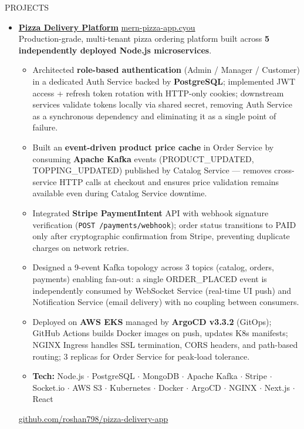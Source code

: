 \documentclass{resume}
\begin{document}
\begin{rSection}{PROJECTS}
\begin{itemize}

\item \href{https://github.com/roshan798/pizza-delivery-app}{\textbf{Pizza Delivery Platform}}
  \hfill \href{https://mern-pizza-app.cyou}{mern-pizza-app.cyou}\\
  Production-grade, multi-tenant pizza ordering platform built across
  \textbf{5 independently deployed Node.js microservices}.
  \begin{itemize}
    \itemsep -3pt
    \item Architected \textbf{role-based authentication} (Admin / Manager / Customer)
          in a dedicated Auth Service backed by \textbf{PostgreSQL};
          implemented JWT access + refresh token rotation with HTTP-only cookies;
          downstream services validate tokens locally via shared secret,
          removing Auth Service as a synchronous dependency and eliminating it
          as a single point of failure.
    \item Built an \textbf{event-driven product price cache} in Order Service by
          consuming \textbf{Apache Kafka} events (PRODUCT\_UPDATED, TOPPING\_UPDATED)
          published by Catalog Service --- removes cross-service HTTP calls at
          checkout and ensures price validation remains available even during
          Catalog Service downtime.
    \item Integrated \textbf{Stripe PaymentIntent} API with webhook signature
          verification (\texttt{POST /payments/webhook}); order status transitions
          to PAID only after cryptographic confirmation from Stripe,
          preventing duplicate charges on network retries.
    \item Designed a 9-event Kafka topology across 3 topics (catalog, orders,
          payments) enabling fan-out: a single ORDER\_PLACED event is independently
          consumed by WebSocket Service (real-time UI push) and Notification Service
          (email delivery) with no coupling between consumers.
    \item Deployed on \textbf{AWS EKS} managed by \textbf{ArgoCD v3.3.2} (GitOps);
          GitHub Actions builds Docker images on push, updates K8s manifests;
          NGINX Ingress handles SSL termination, CORS headers, and path-based
          routing; 3 replicas for Order Service for peak-load tolerance.
    \item \textbf{Tech:} Node.js \(\cdot\) PostgreSQL \(\cdot\) MongoDB \(\cdot\)
          Apache Kafka \(\cdot\) Stripe \(\cdot\) Socket.io \(\cdot\) AWS S3 \(\cdot\)
          Kubernetes \(\cdot\) Docker \(\cdot\) ArgoCD \(\cdot\) NGINX \(\cdot\)
          Next.js \(\cdot\) React
  \end{itemize}
  \href{https://github.com/roshan798/pizza-delivery-app}{github.com/roshan798/pizza-delivery-app}


\end{itemize}
\end{rSection}
\end{document}
